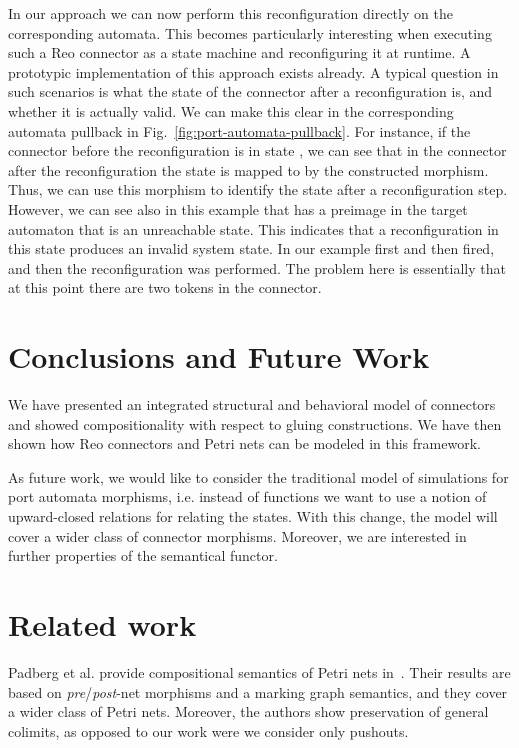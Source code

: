 \documentclass[copyright,creativecommons]{eptcs}
\begin{document}
In our approach we can now perform this reconfiguration directly on the
corresponding automata. This becomes particularly interesting when
executing such a Reo connector as a state machine and reconfiguring it at
runtime. A prototypic implementation of this approach exists already.
A typical question in such scenarios is what the state of the connector
after a reconfiguration is, and whether it is actually valid. 
We can make this clear in the corresponding automata pullback in
Fig.~\ref{fig:port-automata-pullback}. For instance, if the connector 
before the reconfiguration is in state , we can see that in the 
connector after the reconfiguration the state  is mapped to 
by the constructed morphism. Thus, we can use this morphism to identify
the state after a reconfiguration step. However, we can see also in this example
that  has a preimage in the target automaton that is an unreachable state.
This indicates that a reconfiguration in this state produces an invalid system
state. In our example first  and then  fired, and then
the reconfiguration was performed. The problem here is essentially that at this point
there are two tokens in the connector. 



 
\section{Conclusions and Future Work}
\label{sec:discussion}

We have presented an integrated structural and behavioral
model of connectors and showed compositionality with
respect to gluing constructions. We have then shown how Reo 
connectors and Petri nets can be modeled in this framework.

As future work, we would like to consider the traditional model 
of simulations for port automata morphisms, i.e. instead
of functions we want to use a notion of upward-closed relations 
for relating the states. With this change, the model will cover 
a wider class of connector morphisms. Moreover, we are 
interested in further properties of the semantical functor.

\section{Related work}
\label{sec:related-work}

Padberg et al. provide compositional semantics of Petri nets
in~\cite{PER01}. Their results are based on 
\emph{pre}/\emph{post}-net morphisms and a marking graph semantics,
and they cover a wider class of Petri nets. Moreover, the 
authors show preservation of general colimits, as opposed 
to our work were we consider only pushouts.
\end{document}
